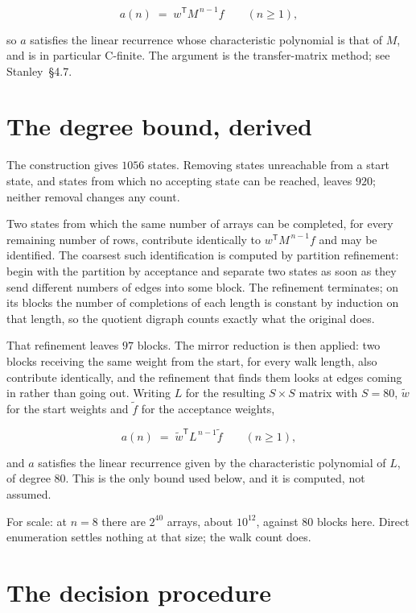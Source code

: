 \documentclass[11pt]{article}
\theoremstyle{definition}
\begin{document}
\[a(n) \;=\; w^{\mathsf T} M^{\,n-1} f \qquad (n \ge 1),\]

so $a$ satisfies the linear recurrence whose characteristic polynomial is that of $M$, and is in particular C-finite. The argument is the transfer-matrix method; see Stanley~\S4.7.

\section{The degree bound, derived}

The construction gives $1056$ states. Removing states unreachable from a start state, and states from which no accepting state can be reached, leaves $920$; neither removal changes any count.

Two states from which the same number of arrays can be completed, for every remaining number of rows, contribute identically to $w^{\mathsf T}M^{\,n-1}f$ and may be identified. The coarsest such identification is computed by partition refinement: begin with the partition by acceptance and separate two states as soon as they send different numbers of edges into some block. The refinement terminates; on its blocks the number of completions of each length is constant by induction on that length, so the quotient digraph counts exactly what the original does.

That refinement leaves $97$ blocks. The mirror reduction is then applied: two blocks receiving the same weight from the start, for every walk length, also contribute identically, and the refinement that finds them looks at edges coming in rather than going out. Writing $L$ for the resulting $S \times S$ matrix with $S = 80$, $\tilde w$ for the start weights and $\tilde f$ for the acceptance weights,

\[a(n) \;=\; \tilde w^{\mathsf T} L^{\,n-1} \tilde f \qquad (n \ge 1),\]

and $a$ satisfies the linear recurrence given by the characteristic polynomial of $L$, of degree $80$. This is the only bound used below, and it is computed, not assumed.

For scale: at $n = 8$ there are $2^{40}$ arrays, about $10^{12}$, against $80$ blocks here. Direct enumeration settles nothing at that size; the walk count does.

\section{The decision procedure}
\end{document}

